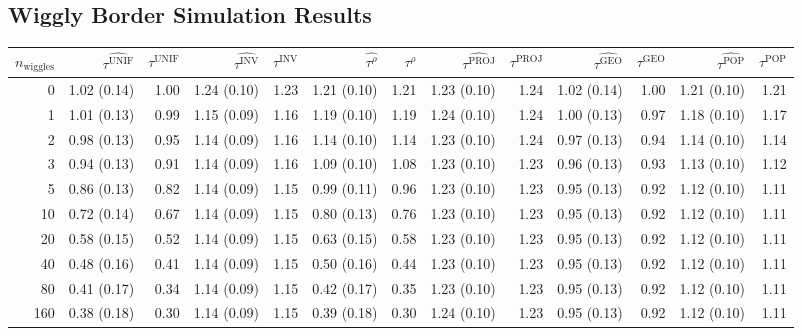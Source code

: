 \documentclass[letter]{article}
\newcommand{\unifavg}{\tau^{\mathrm{UNIF}}}
\newcommand{\invvar}{\tau^{\mathrm{INV}}}
\newcommand{\taurho}{\tau^{\rho}}
\newcommand{\tauproj}{\tau^{\mathrm{PROJ}}}
\newcommand{\taugeo}{\tau^{\mathrm{GEO}}}
\newcommand{\taupop}{\tau^{\mathrm{POP}}}
\begin{document}
\begin{landscape}
    	\section{Wiggly Border Simulation Results}\label{wiggly-border-simulation-results}
    

\begin{table}[!hb]
\begin{tabular}{r|rrrrrrrrrrrr}
\hline
	$n_{\mathrm{wiggles}}$ & $\widehat{\unifavg}$ & $\unifavg$ & $\widehat{\invvar}$ & $\invvar$ & $\widehat{\taurho}$ & $\taurho$ & $\widehat{\tauproj}$ & $\tauproj$ & $\widehat{\taugeo}$ & $\taugeo$ & $\widehat{\taupop}$ & $\taupop$\\
		\hline
0        & 1.02 (0.14) & 1.00    & 1.24 (0.10) & 1.23   & 1.21 (0.10) & 1.21   & 1.23 (0.10) & 1.24    & 1.02 (0.14) & 1.00   & 1.21 (0.10) & 1.21   \\
1        & 1.01 (0.13) & 0.99    & 1.15 (0.09) & 1.16   & 1.19 (0.10) & 1.19   & 1.24 (0.10) & 1.24    & 1.00 (0.13) & 0.97   & 1.18 (0.10) & 1.17   \\
2        & 0.98 (0.13) & 0.95    & 1.14 (0.09) & 1.16   & 1.14 (0.10) & 1.14   & 1.23 (0.10) & 1.24    & 0.97 (0.13) & 0.94   & 1.14 (0.10) & 1.14   \\
3        & 0.94 (0.13) & 0.91    & 1.14 (0.09) & 1.16   & 1.09 (0.10) & 1.08   & 1.23 (0.10) & 1.23    & 0.96 (0.13) & 0.93   & 1.13 (0.10) & 1.12   \\
5        & 0.86 (0.13) & 0.82    & 1.14 (0.09) & 1.15   & 0.99 (0.11) & 0.96   & 1.23 (0.10) & 1.23    & 0.95 (0.13) & 0.92   & 1.12 (0.10) & 1.11   \\
10       & 0.72 (0.14) & 0.67    & 1.14 (0.09) & 1.15   & 0.80 (0.13) & 0.76   & 1.23 (0.10) & 1.23    & 0.95 (0.13) & 0.92   & 1.12 (0.10) & 1.11   \\
20       & 0.58 (0.15) & 0.52    & 1.14 (0.09) & 1.15   & 0.63 (0.15) & 0.58   & 1.23 (0.10) & 1.23    & 0.95 (0.13) & 0.92   & 1.12 (0.10) & 1.11   \\
40       & 0.48 (0.16) & 0.41    & 1.14 (0.09) & 1.15   & 0.50 (0.16) & 0.44   & 1.23 (0.10) & 1.23    & 0.95 (0.13) & 0.92   & 1.12 (0.10) & 1.11   \\
80       & 0.41 (0.17) & 0.34    & 1.14 (0.09) & 1.15   & 0.42 (0.17) & 0.35   & 1.23 (0.10) & 1.23    & 0.95 (0.13) & 0.92   & 1.12 (0.10) & 1.11   \\
160      & 0.38 (0.18) & 0.30    & 1.14 (0.09) & 1.15   & 0.39 (0.18) & 0.30   & 1.24 (0.10) & 1.23    & 0.95 (0.13) & 0.92   & 1.12 (0.10) & 1.11   \\

\end{tabular}
\end{table}
\end{landscape}
\end{document}
